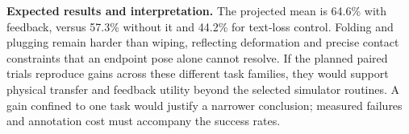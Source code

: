 \textbf{Expected results and interpretation.} The projected mean is 64.6\% with feedback, versus 57.3\% without it and 44.2\% for text-loss control. Folding and plugging remain harder than wiping, reflecting deformation and precise contact constraints that an endpoint pose alone cannot resolve. If the planned paired trials reproduce gains across these different task families, they would support physical transfer and feedback utility beyond the selected simulator routines. A gain confined to one task would justify a narrower conclusion; measured failures and annotation cost must accompany the success rates.

\FloatBarrier
